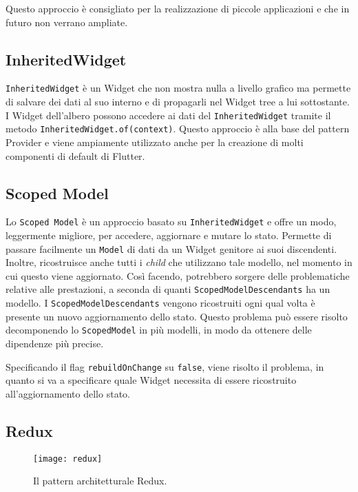 Questo approccio è consigliato per la realizzazione di piccole applicazioni e che in futuro non verrano ampliate.

\subsection{InheritedWidget}
\verb|InheritedWidget| è un Widget che non mostra nulla a livello grafico ma permette di salvare dei dati al suo interno e di propagarli nel Widget tree a lui sottostante. I Widget dell'albero possono accedere ai dati del \verb|InheritedWidget| tramite il metodo \verb|InheritedWidget.of(context)|. Questo approccio è alla base del pattern Provider e viene ampiamente utilizzato anche per la creazione di molti componenti di default di Flutter.

\newpage

\subsection{Scoped Model}
Lo \verb|Scoped Model| è un approccio basato su \verb|InheritedWidget| e offre un modo, leggermente migliore, per accedere, aggiornare e mutare lo stato. Permette di passare facilmente un \verb|Model| di dati da un Widget genitore ai suoi discendenti. Inoltre, ricostruisce anche tutti i \textit{child} che utilizzano tale modello, nel momento in cui questo viene aggiornato. Così facendo, potrebbero sorgere delle problematiche relative alle prestazioni, a seconda di quanti \verb|ScopedModelDescendants| ha un modello. I \verb|ScopedModelDescendants| vengono ricostruiti ogni qual volta è presente un nuovo aggiornamento dello stato. Questo problema può essere risolto decomponendo lo \verb|ScopedModel| in più modelli, in modo da ottenere delle dipendenze più precise. 

Specificando il flag \verb|rebuildOnChange| su \verb|false|, viene risolto il problema, in quanto si va a specificare quale Widget necessita di essere ricostruito all'aggiornamento dello stato.

\subsection{Redux}
\begin{figure}
	\begin{center}
		\texttt{[image: redux]}
		\caption[State management - Redux]{Il pattern architetturale Redux.}
		\label{figura:redux}
	\end{center}
\end{figure}

